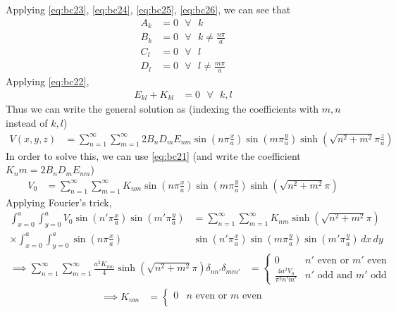 \documentclass[../main.tex]{subfiles}
\begin{document}
\begin{questions}
\begin{parts}
\begin{solution}
			Applying \eqref{eq:bc23}, \eqref{eq:bc24}, \eqref{eq:bc25}, \eqref{eq:bc26}, we can see that
			\begin{align}
				A_k &= 0 \text{ } \forall \text{ } k\\
				B_k &= 0 \text{ } \forall \text{ } k\neq\frac{n\pi}{a}\\
				C_l &= 0 \text{ } \forall \text{ } l\\
				D_l &= 0 \text{ } \forall \text{ } l\neq\frac{m\pi}{a}
			\end{align}
			Applying \eqref{eq:bc22},
			\begin{align}
				E_{kl} + K_{kl} &= 0 \text{ } \forall \text{ } k,l
			\end{align}
			Thus we can write the general solution as (indexing the coefficients with $m,n$ instead of $k,l$)
			\begin{align}
				V(x,y,z) &= \sum_{n=1}^{\infty}\sum_{m=1}^{\infty} 2B_nD_mE_{nm}\sin(n\pi\frac{x}{a})\sin(m\pi\frac{y}{a})\sinh(\sqrt{n^2+m^2}\pi\frac{z}{a})
			\end{align}
			In order to solve this, we can use \eqref{eq:bc21} (and write the coefficient $K_nm=2B_nD_mE_{nm}$)
			\begin{align}
				V_0 &= \sum_{n=1}^{\infty}\sum_{m=1}^{\infty}K_{nm}\sin(n\pi\frac{x}{a})\sin(m\pi\frac{y}{a})\sinh(\sqrt{n^2+m^2}\pi)
			\end{align}
			Applying Fourier's trick,
			\begin{align}
				\int_{x=0}^{a}\int_{y=0}^{a}V_0 \sin(n'\pi\frac{x}{a})\sin(m'\pi\frac{y}{a}) &= \sum_{n=1}^{\infty}\sum_{m=1}^{\infty}K_{nm}\sinh(\sqrt{n^2+m^2}\pi)\\
				\times \int_{x=0}^{a}\int_{y=0}^{a}\sin(n\pi\frac{x}{a})&\sin(n'\pi\frac{x}{a})\sin(m\pi\frac{y}{a})\sin(m'\pi\frac{y}{a})\,dx\,dy
			\end{align}
			\begin{align}
				\implies \sum_{n=1}^{\infty}\sum_{m=1}^{\infty} \frac{a^2K_{nm}}{4}\sinh(\sqrt{n^2+m^2}\pi) \delta_{nn'}\delta_{mm'} &=
				\begin{cases}
					0 & n' \text{ even or } m' \text{ even}\\
					\frac{4a^2V_0}{\pi^2 n'm'} & n' \text{ odd and } m' \text{ odd} 
				\end{cases}
			\end{align}
			\begin{align}
				\implies K_{nm} &=
				\begin{cases}
					0 & n \text{ even or } m \text{ even}\\

\end{cases}
\end{align}
\end{solution}
\end{parts}
\end{questions}
\end{document}
